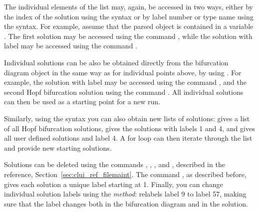\documentclass[12pt]{report}
\begin{document}
 The individual elements of the list may, again, be accessed 
 in two ways, either by the index of the solution using the
 \commandf{[]} syntax or by label number or type name using the
 \commandf{()} syntax.  For example, assume that the parsed object is contained
 in a variable .
 The first solution may be accessed 
 using the command , while the solution with
 label  may be accessed using the command .

 Individual solutions can be also be obtained directly from the
 bifurcation diagram object  in the same way as for
 individual points above, by using .
 For example, the solution with label  may be accessed
 using the command
 , and the second Hopf bifurcation solution using
 the command .
 All individual solutions can then be used as a starting point for a new run.

 Similarly, using the \commandf{()} syntax you can also obtain new lists of
 solutions:  gives a list of all Hopf bifurcation
 solutions,  gives the solutions with labels 1 and 4,
 and  gives all user defined solutions and
 label 4. A for loop can then iterate through the list and provide new
 starting solutions.

 Solutions can be deleted using the commands ,
 , , and , described in
 the reference, Section~\ref{sec:clui_ref_filemaint}. The command
 , as described before, gives each solution a unique
 label starting at 1. Finally, you can change individual solution
 labels using the  \emph{method}:
  relabels label 9 to label 57, making
 sure that the label changes both in the bifurcation diagram and in
 the solution.
\end{document}
